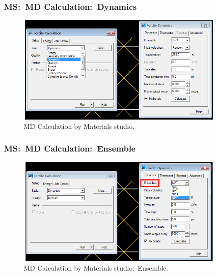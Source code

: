 %
%
\frame
{
	\frametitle{\textrm{MS:~MD Calculation:~Dynamics}}
\begin{figure}[h!]
\centering
\includegraphics[height=2.10in,width=4.05in,viewport=0 0 724 381,clip]{Figures/MS-MD-Dynamics.png}
\caption{\tiny \textrm{MD Calculation by Materials studio.}}%
\label{MS-MD-Dynamics}
\end{figure}
}

\frame
{
	\frametitle{\textrm{MS:~MD Calculation:~Ensemble}}
\begin{figure}[h!]
\centering
\includegraphics[height=2.10in,width=4.05in,viewport=0 0 723 382,clip]{Figures/MS-MD-ensemble.png}
\caption{\tiny \textrm{MD Calculation by Materials studio:~Ensemble.}}%
\label{MS-MD-Dynamics-Ensemble}
\end{figure}
}

